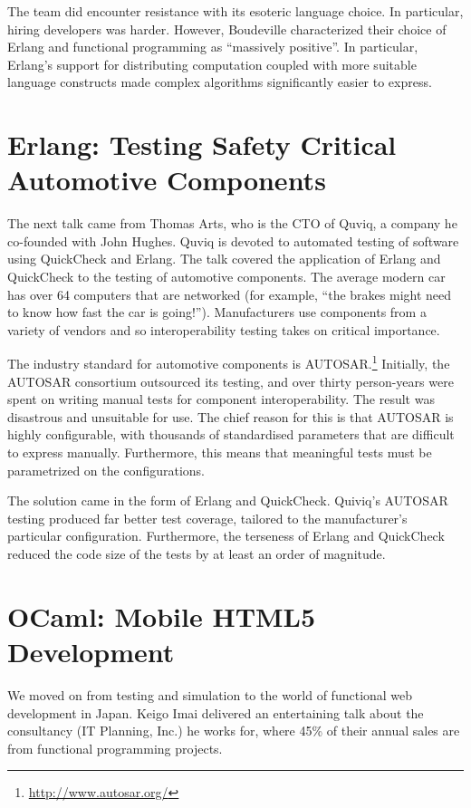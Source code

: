 \documentclass{jfp1}
\begin{document}
The team did encounter resistance with its esoteric language choice.  In
particular, hiring developers was harder.  However, Boudeville characterized their
choice of Erlang and functional programming as ``massively positive''.  In
particular, Erlang's support for distributing computation coupled with more
suitable language constructs made complex algorithms significantly easier to
express.

\section{Erlang: Testing Safety Critical Automotive Components}

The next talk came from Thomas Arts, who is the CTO of Quviq, a company he co-founded with
John Hughes. Quviq is devoted to automated testing of software using
QuickCheck and Erlang.  The talk covered the application of Erlang and
QuickCheck to the testing of automotive components.  The average modern car has
over 64 computers that are networked (for example, ``the brakes might need to know how fast
the car is going!'').  Manufacturers use components from a variety of vendors
and so interoperability testing takes on critical importance.

The industry standard for automotive components is
AUTOSAR.\footnote{\url{http://www.autosar.org/}} Initially, the AUTOSAR
consortium outsourced its testing, and over thirty person-years were spent on
writing manual tests for component interoperability.  The result was disastrous
and unsuitable for use.  The chief reason for this is that AUTOSAR is highly
configurable, with thousands of standardised parameters that are difficult to
express manually.  Furthermore, this means that meaningful tests must be
parametrized on the configurations.

The solution came in the form of Erlang and QuickCheck.  Quiviq's AUTOSAR
testing produced far better test coverage, tailored to the manufacturer's
particular configuration.  Furthermore, the terseness of Erlang and QuickCheck
reduced the code size of the tests by at least an order of magnitude.

\section{OCaml: Mobile HTML5 Development}

We moved on from testing and simulation to the world of functional web
development in Japan. Keigo Imai delivered an entertaining talk about the
consultancy (IT Planning, Inc.) he works for, where 45\% of their annual sales are from
functional programming projects.
\end{document}
